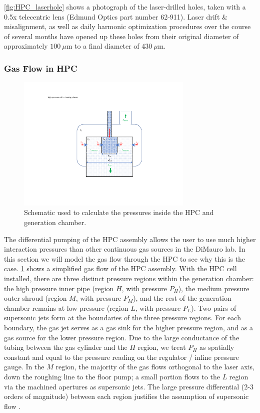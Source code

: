 \cref{fig:HPC_laserhole} shows a photograph of the laser-drilled holes, taken with a 0.5x telecentric lens (Edmund Optics part number 62-911). Laser drift \&  misalignment, as well as daily harmonic optimization procedures over the course of several months have opened up these holes from their original diameter of approximately $100 \ \mu \textrm{m}$ to a final diameter of $430 \ \mu \textrm{m}$.

\subsubsection{Gas Flow in HPC}

\begin{figure}
	\centering
	\includegraphics[width=0.75\textwidth]{figures/chap3/HPC_pressure_schematic.pdf}
	\caption{Schematic used to calculate the pressures inside the HPC and generation chamber.}
	\label{fig:HPC_pressure_schematic}
\end{figure}

The differential pumping of the HPC assembly allows the user to use much higher interaction pressures than other continuous gas sources in the DiMauro lab. In this section we will model the gas flow through the HPC to see why this is the case. \cref{fig:HPC_pressure_schematic} shows a simplified gas flow of the HPC assembly. With the HPC cell installed, there are three distinct pressure regions within the generation chamber: the high pressure inner pipe (region $H$, with pressure $P_H$), the medium pressure outer shroud (region $M$, with pressure $P_M$), and the rest of the generation chamber remains at low pressure (region $L$, with pressure $P_L$). Two pairs of supersonic jets form at the boundaries of the three pressure regions. For each boundary, the gas jet serves as a gas sink for the higher pressure region, and as a gas source for the lower pressure region. Due to the large conductance of the tubing between the gas cylinder and the $H$ region, we treat $P_H$ as spatially constant and equal to the pressure reading on the regulator / inline pressure gauge. In the $M$ region, the majority of the gas flows orthogonal to the laser axis, down the roughing line to the floor pump; a small portion flows to the $L$ region via the machined apertures as supersonic jets. The large pressure differential (2-3 orders of magnitude) between each region justifies the assumption of supersonic flow \cite{millerFreeJetSources1988}.

